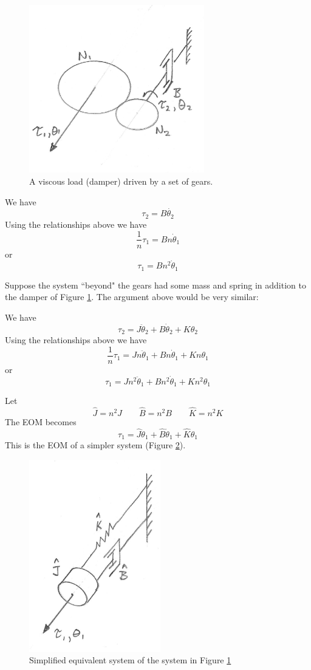 \begin{figure}\centering
\includegraphics[width=3.0in]{figs03/00745.png}
\caption{A viscous load (damper) driven by a set of gears.}\label{dampergears}
\end{figure}

We have
\[
\tau_2 = B \dot{\theta_2}
\]
Using the relationships above we have
\[
\frac{1}{n}\tau_1 = Bn\dot{\theta}_1
\]
or
\[
\tau_1 = Bn^2\dot{\theta}_1
\]

Suppose the system ``beyond" the gears had some mass and spring in addition to the damper of Figure \ref{dampergears}. The argument above would be very similar: 

We have
\[
\tau_2 = J \ddot{\theta}_2 + B \dot{\theta}_2 + K \theta_2
\]
Using the relationships above we have
\[
\frac{1}{n}\tau_1 =J n \ddot{\theta}_1 + B n\dot{\theta}_1 + K n\theta_1
\]
or
\[
\tau_1 =J n^2 \ddot{\theta}_1 + B n^2\dot{\theta}_1 + K n^2\theta_1
\]

Let 
\[
\hat{J} = n^2J \qquad \hat{B} = n^2B \qquad \hat{K} = n^2 K
\]
The EOM becomes
\[
\tau_1 =\hat{J}\ddot{\theta}_1 + \hat{B} \dot{\theta}_1 + \hat{K} \theta_1
\]
This is the EOM of a simpler system (Figure \ref{simplifiedgearsys}). 

\begin{figure}\centering
\includegraphics[width=2.25in]{figs03/00746.png}
\caption{Simplified equivalent system of the system in Figure \ref{dampergears}}\label{simplifiedgearsys}
\end{figure}



